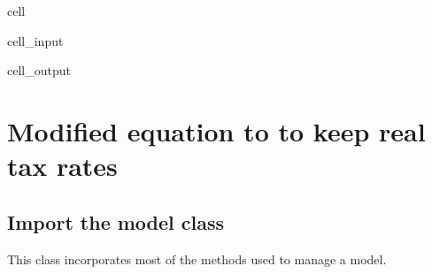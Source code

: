 \documentclass[letterpaper,10pt,english]{jupyterBook}
\begin{document}
\begin{sphinxuseclass}{cell}\begin{sphinxVerbatimInput}

\begin{sphinxuseclass}{cell_input}
\begin{sphinxVerbatim}[commandchars=\\\{\}]
\PYG{p}{[}\PYG{p}{]}
\end{sphinxVerbatim}

\end{sphinxuseclass}\end{sphinxVerbatimInput}
\begin{sphinxVerbatimOutput}

\begin{sphinxuseclass}{cell_output}
\begin{sphinxVerbatim}[commandchars=\\\{\}]
[\PYGZsq{}FRML \PYGZlt{}CALC\PYGZgt{} PAKBMFSTOTHRCD\PYGZus{}A = \PYGZhy{}PAKBMFSTOTHRCD/PAKNYGDPMKTPCD+ ((\PYGZhy{}0.0106244247103773)) \PYGZsq{},
 \PYGZsq{} FRML \PYGZlt{}CALC\PYGZgt{} PAKBMFSTREMTCD\PYGZus{}A = \PYGZhy{}PAKBMFSTREMTCD/PAKNYGDPMKTPCD+ ((5.83179728399106E\PYGZhy{}05)) \PYGZsq{},
 \PYGZsq{} FRML \PYGZlt{}CALC\PYGZgt{} PAKBMGSRGNFSCD\PYGZus{}A = \PYGZhy{}100*PAKBMGSRGNFSCD/PAKBMGSRGNFSCD(\PYGZhy{}1)+ (((100 * ( (PAKNEIMPGNFSCD) / (PAKNEIMPGNFSCD(\PYGZhy{}1)) \PYGZhy{}1)) +0.16331992292838*DUMH)) +100\PYGZsq{}]
\end{sphinxVerbatim}

\end{sphinxuseclass}\end{sphinxVerbatimOutput}

\end{sphinxuseclass}
\sphinxstepscope


\chapter{Modified equation to to keep real tax rates}
\label{\detokenize{content/howto/modifymodel/create_real_model:modified-equation-to-to-keep-real-tax-rates}}\label{\detokenize{content/howto/modifymodel/create_real_model::doc}}

\section{Import the model class}
\label{\detokenize{content/howto/modifymodel/create_real_model:import-the-model-class}}
\sphinxAtStartPar
This class incorporates most of the methods used to manage a model.
\end{document}

